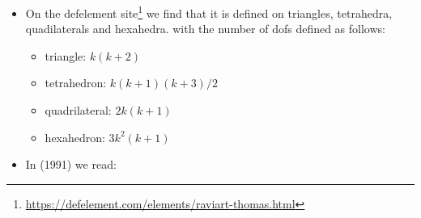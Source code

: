 \begin{itemize}
\begin{displayquote}
{Consider a simplicial triangulation with mesh cells $\{K\}$ and let ${\bm P}_k(K)=(P_k(K))^d$, $k\ge 0$.
Then, the following local polynomial space is defined directly on $K$:
\[
RT_k(K)=\{ {\bm v} \in ({\bm P}_k(K) + {\bm x} P_k(K)) : 
{\bm v}\cdot{\bm n}_{\partial K} \in R_k(\partial K)\},
\qquad k\ge 0,
\]
where
\[
R_k(\partial K)=\{ \phi \in L^2(\partial K): \phi|_E\in P_k(E) \text{ for all faces } E\subset \partial K \}
\]
It is noted in \textcite{bobf13} (remark 2.3.1) that this definition of $RT_k(K)$
is different than the original definition in \textcite{rath77} (1977).

In particular, the Raviart-Thomas element of lowest order is given by
\[
RT_0(K)=\{ {\bm v} \in ({\bm P}_0(K)+{\bm x} P_0(K)) : {\bm v} \cdot {\bm n}_{\partial K} \in R_0(\partial K)  \}
\]
i.e., it is linear on $K$. Its local functionals are ${\bm v} \cdot {\bm n}_{E_i}$, $i=1,..d+1$. 
A function from $RT_0(K)$ can be written in the form
\[
{\bm v}({\bm x}) = {\bm a} + b {\bm x}, \quad {\bm a}\in \R^d, b\in \R, {\bm x}\in K. \qquad B.21
\]
A face $E\subset \partial K$ is a hyperplane that can be represented in the form
\[
{\bm x}\cdot {\bm n}_E = c, \qquad c\in \R, \forall {\bm x} \in E.
\]
Inserting this representation in (B.21) yields
\[
{\bm v}({\bm x})\cdot {\bm n}_E = {\bm a}\cdot {\bm n}_E + b {\bm x} \cdot {\bm n}_E = {\bm a}\cdot {\bm n}_E + bc =const
\qquad \forall {\bm x}\in E.
\]
Thus, the normal component of ${\bm v}$ on each face is a constant.

}
\end{displayquote}



\item 
On the defelement site\footnote{\url{https://defelement.com/elements/raviart-thomas.html}} we find 
that it is defined on triangles, tetrahedra, quadilaterals and hexahedra.
with the number of dofs defined as follows:
\begin{itemize}
\item triangle: $k(k+2)$
\item tetrahedron: $k(k+1)(k+3)/2$
\item quadrilateral: $2k(k+1)$
\item hexahedron: $3k^2(k+1)$
\end{itemize}

\item
In \textcite{brfo} (1991) we read:


\end{itemize}
